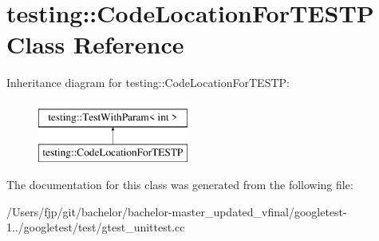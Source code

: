 \hypertarget{classtesting_1_1_code_location_for_t_e_s_t_p}{}\section{testing\+:\+:Code\+Location\+For\+T\+E\+S\+TP Class Reference}
\label{classtesting_1_1_code_location_for_t_e_s_t_p}
Inheritance diagram for testing\+:\+:Code\+Location\+For\+T\+E\+S\+TP\+:\begin{figure}[H]
\begin{center}
\leavevmode
\includegraphics[height=2.000000cm]{classtesting_1_1_code_location_for_t_e_s_t_p}
\end{center}
\end{figure}


The documentation for this class was generated from the following file\+:\begin{DoxyCompactItemize}
\item 
/\+Users/fjp/git/bachelor/bachelor-\/master\+\_\+updated\+\_\+vfinal/googletest-\/1../googletest/test/gtest\+\_\+unittest.\+cc\end{DoxyCompactItemize}
